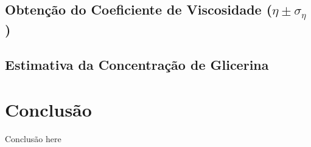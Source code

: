 \documentclass[english,brazil]{article}
\begin{document}

	\subsection{Obtenção do Coeficiente de Viscosidade ($\eta\pm\sigma_{\eta}$)}

	\subsection{Estimativa da Concentração de Glicerina}


\section{Conclusão}

	Conclusão here
\end{document}
